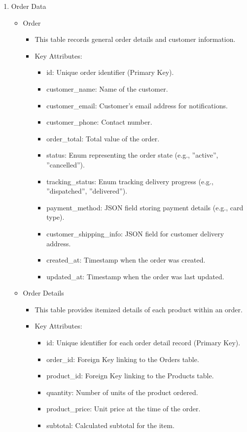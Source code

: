 \documentclass{llncs}
\begin{document}
\begin{enumerate}
    \item Order Data\\
    \begin{itemize}
        \item Order 
        \begin{itemize}
            \item This table records general order details and customer information.
            \item Key Attributes:
            \begin{itemize}
                \item id: Unique order identifier (Primary Key).
                \item customer\_name: Name of the customer.
                \item customer\_email: Customer's email address for notifications.
                \item customer\_phone: Contact number.
                \item order\_total: Total value of the order.
                \item status: Enum representing the order state (e.g., ''active'', ''cancelled'').
                \item tracking\_status: Enum tracking delivery progress (e.g., ''dispatched'', ''delivered'').
                \item payment\_method: JSON field storing payment details (e.g., card type).
                \item customer\_shipping\_info: JSON field for customer delivery address.
                \item created\_at: Timestamp when the order was created.
                \item updated\_at: Timestamp when the order was last updated.\\
            \end{itemize}
        \end{itemize}
        \item Order Details
        \begin{itemize}
            \item This table provides itemized details of each product within an order.
            \item Key Attributes:
            \begin{itemize}
                \item id: Unique identifier for each order detail record (Primary Key).
                \item order\_id: Foreign Key linking to the Orders table.
                \item product\_id: Foreign Key linking to the Products table.
                \item quantity: Number of units of the product ordered.
                \item product\_price: Unit price at the time of the order.
                \item subtotal: Calculated subtotal for the item.\\
                

\end{itemize}
\end{itemize}
\end{itemize}
\end{enumerate}
\end{document}
